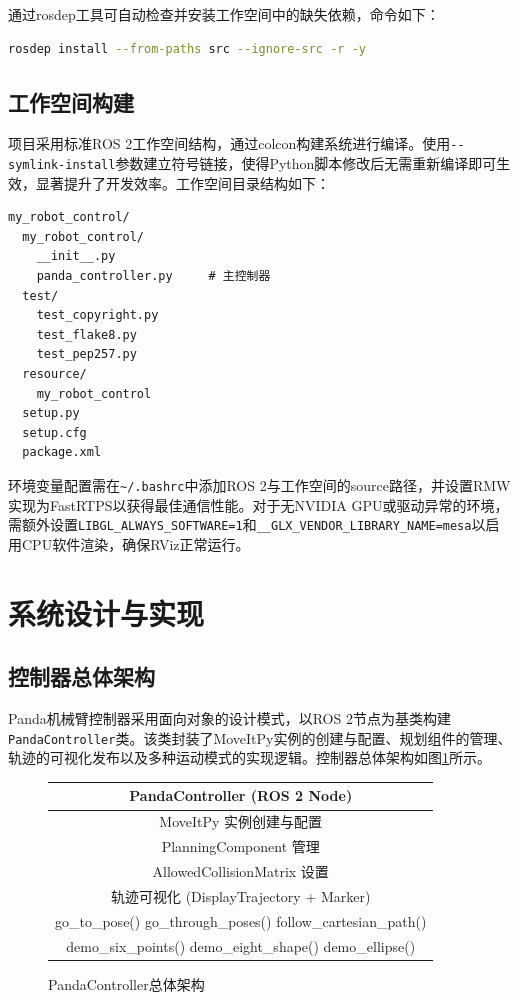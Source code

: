 \documentclass[a4paper,12pt]{ctexart}
\newcommand{\bodytext}{\fontsize{12pt}{20pt}\selectfont\setlength{\parskip}{0pt}}
\begin{document}
通过rosdep工具可自动检查并安装工作空间中的缺失依赖，命令如下：

\begin{lstlisting}[language=bash, caption={依赖安装命令}]
rosdep install --from-paths src --ignore-src -r -y
\end{lstlisting}

\subsection{工作空间构建}

\bodytext

项目采用标准ROS 2工作空间结构，通过colcon构建系统进行编译。使用\texttt{-{}-symlink-install}参数建立符号链接，使得Python脚本修改后无需重新编译即可生效，显著提升了开发效率。工作空间目录结构如下：

\begin{lstlisting}[language={}, caption={项目目录结构}]
my_robot_control/
  my_robot_control/
    __init__.py
    panda_controller.py     # 主控制器
  test/
    test_copyright.py
    test_flake8.py
    test_pep257.py
  resource/
    my_robot_control
  setup.py
  setup.cfg
  package.xml
\end{lstlisting}

环境变量配置需在\texttt{\textasciitilde/.bashrc}中添加ROS 2与工作空间的source路径，并设置RMW实现为FastRTPS以获得最佳通信性能。对于无NVIDIA GPU或驱动异常的环境，需额外设置\texttt{LIBGL\_ALWAYS\_SOFTWARE=1}和\texttt{\_\_GLX\_VENDOR\_LIBRARY\_NAME=mesa}以启用CPU软件渲染，确保RViz正常运行。

\section{系统设计与实现}

\subsection{控制器总体架构}

\bodytext

Panda机械臂控制器采用面向对象的设计模式，以ROS 2节点为基类构建\texttt{PandaController}类。该类封装了MoveItPy实例的创建与配置、规划组件的管理、轨迹的可视化发布以及多种运动模式的实现逻辑。控制器总体架构如图\ref{fig:arch}所示。

\begin{figure}[htbp]
\centering
\begin{tabular}{c}
\toprule
\textbf{PandaController (ROS 2 Node)} \\
\midrule
MoveItPy 实例创建与配置 \\
PlanningComponent 管理 \\
AllowedCollisionMatrix 设置 \\
\midrule
轨迹可视化 (DisplayTrajectory + Marker) \\
\midrule
go\_to\_pose() \quad go\_through\_poses() \quad follow\_cartesian\_path() \\
\midrule
demo\_six\_points() \quad demo\_eight\_shape() \quad demo\_ellipse() \\
\bottomrule
\end{tabular}
\caption{PandaController总体架构}
\label{fig:arch}
\end{figure}
\end{document}
